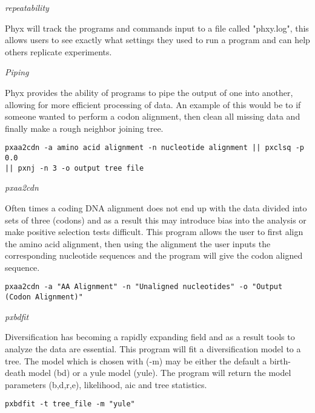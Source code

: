 \documentclass[12pt,letterpaper]{article}
\renewcommand{\subsection}[1]{%
\bigskip
\begin{center}
\begin{large}
\normalfont\itshape #1
\end{large}
\end{center}}
\begin{document}
\subsection{repeatability}

Phyx will track the programs and commands input to a file called "phxy.log", this allows users to see exactly what settings they used to run a program and can help others replicate experiments.

\subsection{Piping}

Phyx provides the ability of programs to pipe the output of one into another, allowing for more efficient processing of data. An example of this would be to if someone wanted to perform a codon alignment, then clean all missing data and finally make a rough neighbor joining tree.
\begin{flushleft}
\begin{verbatim}
pxaa2cdn -a amino acid alignment -n nucleotide alignment || pxclsq -p 0.0 
|| pxnj -n 3 -o output tree file
\end{verbatim}
\end{flushleft}
\subsection{pxaa2cdn}

Often times a coding DNA alignment does not end up with the data divided into sets of three (codons) and as a result this may introduce bias into the analysis or make positive selection tests difficult. This program allows the user to first align the amino acid alignment, then using the alignment the user inputs the corresponding nucleotide sequences and the program will give the codon aligned sequence.
\begin{flushleft}
\begin{verbatim}
pxaa2cdn -a "AA Alignment" -n "Unaligned nucleotides" -o "Output (Codon Alignment)"
\end{verbatim}
\end{flushleft}

\subsection{pxbdfit}

Diversification has becoming a rapidly expanding field and as a result tools to analyze the data are essential. This program will fit a diversification model to a tree. The model which is chosen with (-m) may be either the default a birth-death model (bd) or a yule model (yule). The program will return the model parameters (b,d,r,e), likelihood, aic and tree statistics.
\begin{flushleft}
\begin{verbatim}
pxbdfit -t tree_file -m "yule"
\end{verbatim}
\end{flushleft}
\end{document}
